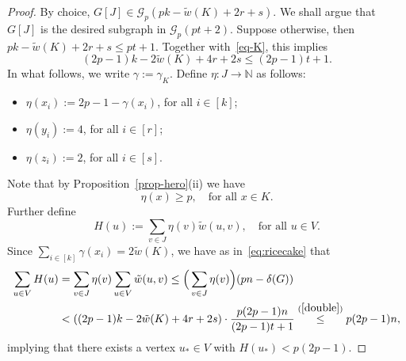 \documentclass[10pt,a4paper]{article}
\theoremstyle{definition}
\begin{document}
\begin{proof}
	By choice, $G[J] \in \mathcal{G}_p(pk-\tilde{w}(K)+2r+s)$.
	We shall argue that $G[J]$ is the desired subgraph in $\mathcal{G}_p(pt+2)$. Suppose otherwise, then
	$pk-\tilde{w}(K)+2r+s \leq pt+1$.
	Together with~\eqref{eq-K}, this implies
	\begin{equation}\label{double}
		(2p-1)k - 2\tilde{w}(K) + 4r+2s \leq (2p-1)t+1.
	\end{equation}
	In what follows, we write $\gamma := \gamma_K$. Define $\eta: J\rightarrow \mathbb{N}$ as follows:
	\begin{itemize}
		\item $\eta(x_i) := 2p-1-\gamma(x_i)$, for all $i \in [k]$;
		\item $\eta(y_i) := 4$, for all $i \in [r]$;
		\item $\eta(z_i) := 2$, for all $i \in [s]$.
	\end{itemize}
	Note that by Proposition~\ref{prop-hero}(ii) we have
	\begin{equation}\label{eq-etap}
	\eta(x) \geq p, \quad\text{for all }x \in K.
	\end{equation}
	Further define
	$$
	H(u) := \sum_{v \in J}\eta(v)\tilde{w}(u,v),\quad\text{for all }u \in V.
	$$
	Since $\sum_{i\in [k]}\gamma(x_i)=2\tilde{w}(K)$, we have as in~\eqref{eq:ricecake} that
	\begin{align*}
		\sum_{u \in V}H(u) &= \sum_{v \in J}\eta(v)\sum_{u \in V}\tilde{w}(u,v) \leq \Big(\sum_{v \in J}\eta(v)\Big)(pn-\delta(G))\\
		&< ((2p-1)k - 2\tilde{w}(K) + 4r+2s) \cdot \frac{p(2p-1)n}{(2p-1)t+1} \stackrel{(\ref{double})}{\leq} p(2p-1)n,
	\end{align*}
	implying that there exists a vertex $u_* \in V$ with $H(u_*) < p(2p-1)$.
	

\end{proof}
\end{document}
